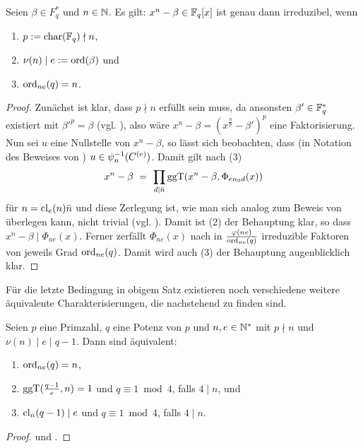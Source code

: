 \begin{satz}
  \label{satz:binom_irreduzibel}
  Seien $\beta \in F_q^\ast$ und $n\in \mathbb{N}$. Es gilt:
  $x^n -\beta \in \mathbb{F}_q[x]$ ist genau
  dann irreduzibel, wenn 
  \begin{enumerate}
    \item $p := \operatorname{char}(\mathbb{F}_q) \nmid n$,
    \item $\nu(n) \mid e := \operatorname{ord}(\beta)$ und
    \item $\operatorname{ord}_{ne}(q) = n$.
  \end{enumerate}
\end{satz}
\begin{proof}
  Zunächst ist klar, dass $p \nmid n$ erfüllt sein muss, da ansonsten 
  $\beta' \in \mathbb{F}_q^\ast$ existiert mit $\beta'^p = \beta$ 
  (vgl. ), also wäre
  $x^n-\beta = (x^\frac n p - \beta')^p$ eine Faktorisierung.
  Nun sei $u$ eine Nullstelle von $x^n-\beta$, so lässt sich beobachten, dass
  (in Notation des Beweises von
  )
  $u \in \psi_n^{-1}(C^{(e)})$. Damit gilt nach
   (3)
  \[ x^n-\beta \ =\  \prod_{d\mid \bar n} \operatorname{ggT}(x^n-\beta, \Phi_{en_0d}(x))\]
  für $n = \operatorname{cl}_{e}(n) \bar n$ und diese Zerlegung ist, wie man sich analog zum
  Beweis von  überlegen kann, 
  nicht trivial (vgl. \autocite[Proposition 5.3.5]{hachenberger2015}). 
  Damit ist (2) der Behauptung
  klar, so dass $x^n-\beta \mid \Phi_{ne}(x)$. Ferner zerfällt $\Phi_{ne}(x)$
  nach  in 
  $\frac{\varphi(ne)}{\operatorname{ord}_{ne}(q)}$ irreduzible Faktoren von jeweils Grad
  $\operatorname{ord}_{ne}(q)$. Damit wird auch (3) der Behauptung augenblicklich klar.
\end{proof}

Für die letzte Bedingung in obigem Satz existieren noch verschiedene weitere
äquivalente Charakterisierungen, die nachstehend zu finden sind.

\begin{satz}
  \label{satz:binom_irreduzibel_aquiv}
  Seien $p$ eine Primzahl, $q$ eine Potenz von $p$ und $n,e\in \mathbb{N}^\ast$ 
  mit $p\nmid n$ und $\nu(n)\mid e\mid q-1$. Dann sind äquivalent:
  \begin{enumerate}
    \item $\operatorname{ord}_{ne}(q)  = n$,
    \item $\operatorname{ggT}(\tfrac{q-1}{e},n)=1$ und $q\equiv 1 \bmod 4$, falls $4\mid n$,
      und
    \item $\operatorname{cl}_n(q-1) \mid e$ und $q\equiv 1 \bmod 4$, falls $4\mid n$.
  \end{enumerate}
\end{satz}
\begin{proof}
  \autocite[Theorem 5.3.7]{hachenberger2015} und 
  \autocite[Corollary 5.3.8]{hachenberger2015}.
\end{proof}


